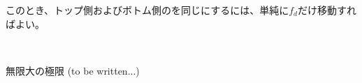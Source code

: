 このとき、トップ側およびボトム側の\AlocationLength を同じにするには、単純に$f_d$だけ移動すればよい。

~\vfill
\begin{\Columnname}{\CenterCurvatureRadius 無限大の極限\TBW}
(to be written...)
\end{\Columnname}
